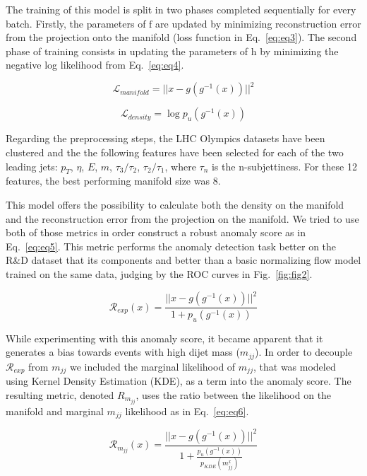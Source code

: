 \documentclass[letterpaper,11pt]{article}
\begin{document}
The training of this model is split in two phases completed sequentially for every batch. Firstly, the parameters of $ \mathrm{f}$ are updated by minimizing reconstruction error from the projection onto the manifold (loss function in Eq.~\ref{eq:eq3}). The second phase of training consists in updating the parameters of $\mathrm{h}$ by minimizing the negative log likelihood from Eq.~\ref{eq:eq4}. 

\begin{equation}
    \mathcal{L}_{manifold} = \lvert \lvert x-g(g^{-1}(x)) \lvert \lvert ^2
    \label{eq:eq3}
\end{equation}

\begin{equation}
    \mathcal{L}_{density} = \log p_{u}(g^{-1}(x))
    \label{eq:eq4}
\end{equation}

Regarding the preprocessing steps, the LHC Olympics datasets have been clustered and the the following features have been selected for each of the two leading jets: $p_T$, $\eta$, $E$, $m$, $\tau_3/\tau_2$, $\tau_2/\tau_1$, where $\tau_n$ is the n-subjettiness. For these 12 features, the best performing manifold size was 8.

This model offers the possibility to calculate both the density on the manifold and the reconstruction error from the projection on the manifold. We tried to use both of those metrics in order construct a robust anomaly score as in Eq.~\ref{eq:eq5}. This metric performs the anomaly detection task better on the R\&D dataset that its components and better than a basic normalizing flow model trained on the same data, judging by the ROC curves in Fig.~\ref{fig:fig2}.

\begin{equation}
    \mathcal{R}_{exp}(x) = \frac{\lvert \lvert x-g(g^{-1}(x)) \lvert \lvert ^2}{1+p_{u}(g^{-1}(x))}
    \label{eq:eq5}
\end{equation}

While experimenting with this anomaly score, it became apparent that it generates a bias towards events with high dijet mass ($m_{jj}$). In order to decouple $ \mathcal{R}_{exp}$ from $m_{jj}$ we included the marginal likelihood of $m_{jj}$, that was modeled using Kernel Density Estimation (KDE), as a term into the anomaly score. The resulting metric, denoted ${R}_{m_{jj}}$, uses the ratio between the likelihood on the manifold and marginal $m_{jj}$ likelihood as in Eq.~\ref{eq:eq6}.

\begin{equation}
    \mathcal{R}_{m_{jj}}(x) = \frac{\lvert \lvert x-g(g^{-1}(x)) \lvert \lvert ^2}{1+\frac{p_{u}(g^{-1}(x))}{p_{KDE}(m^{x}_{jj})}}
    \label{eq:eq6}
\end{equation}
\end{document}
